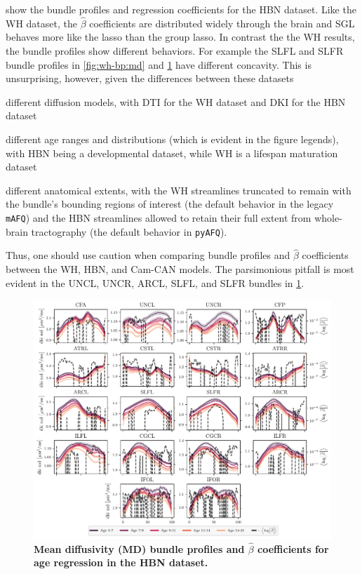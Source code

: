 \documentclass[10pt,%
               aps,%
               prl,%
               preprint,%
               superscriptaddress,%
               preprintnumbers,%
               amsmath,%
               floatfix,%
               endfloats*]{revtex4-2}
\begin{document}
 show the bundle profiles and regression
coefficients for the HBN dataset. Like the WH dataset, the $\hat{\beta}$
coefficients are distributed widely through the brain and SGL behaves more
like the lasso than the group lasso. In contrast the the WH results,
the bundle profiles show different behaviors. For example the SLFL and SLFR
bundle profiles in \cref{fig:wh-bp:md} and \cref{fig:hbn-bp:md} have
different concavity. This is unsurprising, however, given the differences
between these datasets
\begin{enumerate*}[%
    label=(\roman*),%
    before=\unskip{: },%
    itemjoin={{, }},%
    itemjoin*={{, and }}]
    \item different diffusion models, with DTI for the WH dataset and DKI for
    the HBN dataset
    \item different age ranges and distributions (which is evident in the
    figure legends), with HBN being a developmental dataset, while WH is a
    lifespan maturation dataset
    \item different anatomical extents, with the WH streamlines truncated to
    remain with the bundle's bounding regions of interest (the default
    behavior in the legacy \texttt{mAFQ}) and the HBN streamlines allowed
    to retain their full extent from whole-brain tractography (the default
    behavior in \texttt{pyAFQ}).
\end{enumerate*}
Thus, one should use caution when comparing bundle profiles and $\hat{\beta}$
coefficients between the WH, HBN, and Cam-CAN models.
The parsimonious pitfall is most evident in the UNCL, UNCR, ARCL, SLFL, and
SLFR bundles in \cref{fig:hbn-bp:md}.

\begin{figure}
    \includegraphics[width=\textwidth]{hbn_coefs_profiles_md.pdf}
    \caption{%
        {%
            \bf Mean diffusivity (MD) bundle profiles and $\hat{\beta}$
            coefficients for age regression in the HBN dataset.
        }
        \label{fig:hbn-bp:md}
    }
\end{figure}
\end{document}
